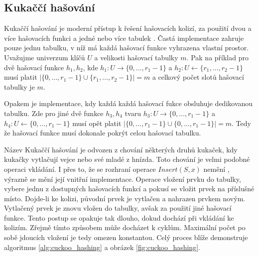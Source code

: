 \subsection{Kukaččí hašování}

Kukaččí hašování je moderní přístup k řešení hašovacích kolizí, za použití dvou a více hašovacích
funkci a jedné nebo více tabulek \cite{Cuckoo_hashing}. Častá implementace zahruje pouze jednu
tabulku, v níž má každá hašovací funkce vyhrazena vlastní prostor. Uvažujme univerzum klíčů $U$
a velikosti hašovací tabulky $m$. Pak na příklad pro dvě hašovací funkce 
$h_1, h_2$, kde $h_1 : U \rightarrow \{0,\ldots,r_1-1\}$ a $h_2 : U \leftarrow \{r_1,\ldots,r_2-1\}$ musí platit
$|\{0,\ldots,r_1-1\} \cup \{r_1,\ldots,r_2-1\}| = m$ a celkový počet slotů hašovací tabulky je $m$.

Opakem je implementace, kdy každá každá hašovací fukce obsluhuje dedikovanou tabulku. Zde pro
jiné dvě funkce $h_3, h_4$ tvaru $h_3 : U \rightarrow \{0,\ldots,r_1-1\}$ a $h_4 : U \leftarrow \{0,\ldots,r_1-1\}$
musí opět platit $|\{0,\ldots,r_1-1\} \cup \{0,\ldots,r_1-1\}| = m$. Tedy že hašovací funkce musí dokonale pokrýt
celou hašovací tabulku.

Název Kukaččí hašování je odvozen z chování některých druhů kukaček, kdy kukačky vytlačují vejce nebo své mladé
z hnízda. Toto chování je velmi podobné operaci vkládání. I přes to, že se rozhraní operace $Insert(S,x)$ nemění 
, výrazně se mění její vnitřní implementace. Operace vložení prvku do tabulky, vybere jednu z dostupných hašovacích
funkcí a pokusí se vložit prvek na příslušné místo. Dojde-li ke kolizi, původní prvek je vytlačen a nahrazen prvkem novým.
Vytlačený prvek je znovu vložen do tabulky, avšak za použití jiné hašovací funkce. Tento postup se opakuje tak dlouho, dokud
dochází při vkládání ke kolizím. Zřejmě tímto způsobem může docházet k cyklům. Maximální počet po sobě jdoucích vložení je tedy
omezen konstantou. Celý proces blíže demonstruje algoritmus \ref{alg:cuckoo_hashing} a obrázek \ref{fig:cuckoo_hashing}.

